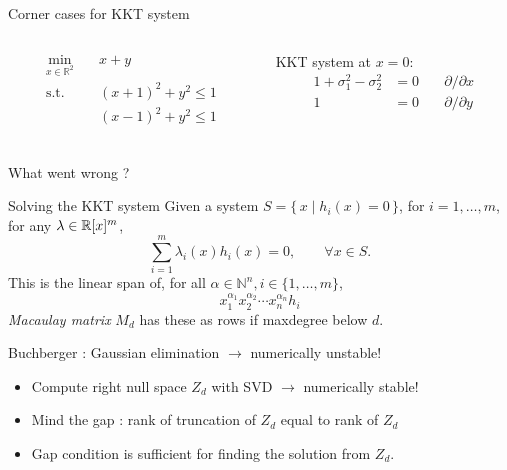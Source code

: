 \documentclass{beamer}
\begin{document}
\begin{frame}{Corner cases for KKT system}
  \begin{columns}
    \begin{column}{0.4\textwidth}
      \begin{align*}
        \min_{x \in \mathbb{R}^2} \quad & x + y\\
        \text{s.t.} \quad & (x + 1)^2 + y^2 \le 1\\
                          & (x - 1)^2 + y^2 \le 1\\
      \end{align*}
    \end{column}
    \begin{column}{0.4\textwidth}
      KKT system at $x = 0$:
      \begin{align*}
        1 + \sigma_1^2 - \sigma_2^2 & = 0 & \quad \partial/\partial x\\
        1 & = 0 & \quad \partial/\partial y
      \end{align*}
    \end{column}
  \end{columns}
  \vspace{-3em}
  \begin{center}
  \end{center}
  \begin{block}{What went wrong ?}
  \end{block}
\end{frame}

\begin{frame}{Solving the KKT system}
  Given a system $S = \{\, x \mid h_i(x) = 0 \,\}$, for $i = 1, \ldots, m$,
  for any $\lambda \in \mathbb{R}[x]^m$,
  \[
    \sum_{i=1}^m \lambda_i(x) h_i(x) = 0, \qquad \forall x \in S.
  \]
  This is the linear span of,
  for all $\alpha \in \mathbb{N}^n, i \in \{1, \ldots, m\}$,
  \[
    x_1^{\alpha_1}x_2^{\alpha_2} \cdots x_n^{\alpha_n} h_i
  \]
  \emph{\alert{Macaulay} matrix} $M_d$ has these as rows if maxdegree below $d$.

  Buchberger : \alert{Gaussian elimination} $\to$ \alert{numerically unstable}!

  \begin{itemize}
    \item Compute right null space $Z_d$ with SVD $\to$ \alert{numerically stable}!
    \item \alert{Mind the gap} : rank of truncation of $Z_d$ equal to rank of $Z_d$
    \item Gap condition is \alert{sufficient} for finding the solution from $Z_d$.
  \end{itemize}
\end{frame}
\end{document}
